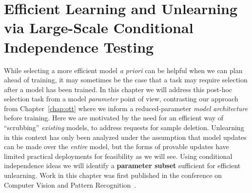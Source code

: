\chapter{Efficient Learning and Unlearning via Large-Scale Conditional Independence Testing} \label{chap:lcodec} 

While selecting a more efficient model \textit{a priori}
can be helpful when we can plan ahead of training,
it may sometimes be the case
that a task may require selection
after a model has been trained.
In this chapter we will 
address this post-hoc selection task
from a model \textit{parameter} point of view,
contrasting our 
approach from Chapter~\ref{chap:ott}
where we inform a reduced-parameter
\textit{model architecture}
before training.
Here we are motivated by the need for an efficient way of 
``scrubbing'' \textit{existing }models,
to address requests for sample deletion.
Unlearning in this context has
only been analyzed under the assumption
that model updates can be made over the \textit{entire} model,
but the forms of provable updates have limited
practical deployments for feasibility
as we will see.
Using conditional independence ideas
we will identify a \textbf{parameter subset} sufficient for
efficient unlearning.
Work in this chapter was first published
in the conference on Computer Vision and Pattern Recognition~\citep{lcodecunlearn}.









